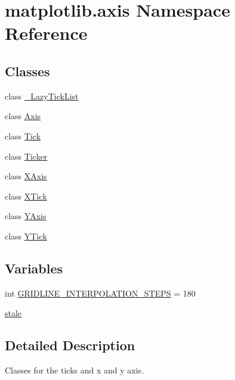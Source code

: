 \hypertarget{namespacematplotlib_1_1axis}{}\section{matplotlib.\+axis Namespace Reference}
\label{namespacematplotlib_1_1axis}
\subsection*{Classes}
\begin{DoxyCompactItemize}
\item 
class \hyperlink{classmatplotlib_1_1axis_1_1__LazyTickList}{\+\_\+\+Lazy\+Tick\+List}
\item 
class \hyperlink{classmatplotlib_1_1axis_1_1Axis}{Axis}
\item 
class \hyperlink{classmatplotlib_1_1axis_1_1Tick}{Tick}
\item 
class \hyperlink{classmatplotlib_1_1axis_1_1Ticker}{Ticker}
\item 
class \hyperlink{classmatplotlib_1_1axis_1_1XAxis}{X\+Axis}
\item 
class \hyperlink{classmatplotlib_1_1axis_1_1XTick}{X\+Tick}
\item 
class \hyperlink{classmatplotlib_1_1axis_1_1YAxis}{Y\+Axis}
\item 
class \hyperlink{classmatplotlib_1_1axis_1_1YTick}{Y\+Tick}
\end{DoxyCompactItemize}
\subsection*{Variables}
\begin{DoxyCompactItemize}
\item 
int \hyperlink{namespacematplotlib_1_1axis_a529491010bb096898cc0a5914c745844}{G\+R\+I\+D\+L\+I\+N\+E\+\_\+\+I\+N\+T\+E\+R\+P\+O\+L\+A\+T\+I\+O\+N\+\_\+\+S\+T\+E\+PS} = 180
\item 
\hyperlink{namespacematplotlib_1_1axis_a24a9631c6fe3a2d2f4032614a9114ab2}{stale}
\end{DoxyCompactItemize}


\subsection{Detailed Description}
\begin{DoxyVerb}Classes for the ticks and x and y axis.
\end{DoxyVerb}
 

